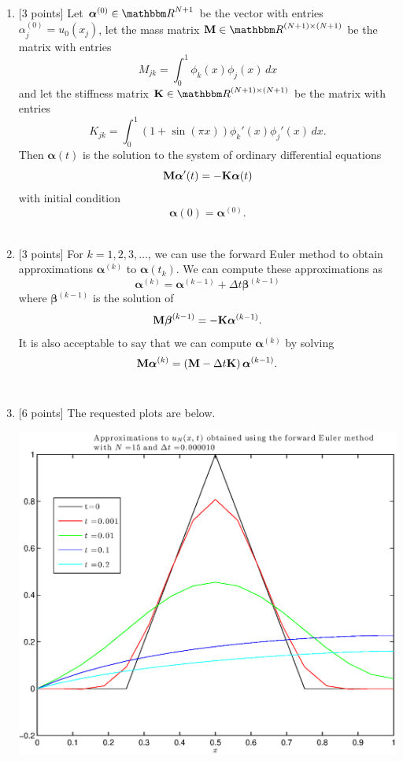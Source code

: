 \begin{solution}
\begin{enumerate}
\item {[3 points]} Let $\boldsymbol{\alpha}^{(0)}\in\R^{N+1}$ be the vector with entries $\alpha_j^{(0)}=u_0(x_j)$, let the mass matrix $\BM\in\R^{\left(N+1\right)\times\left(N+1\right)}$ be the matrix with entries
\[
M_{jk}=\int_0^1\phi_k(x)\phi_j(x)\,dx
\]
and let the stiffness matrix $\BK\in\R^{\left(N+1\right)\times\left(N+1\right)}$ be the matrix with entries
\[
K_{jk}=\int_0^1(1+\sin(\pi x))\phi_k'(x)\phi_j'(x)\,dx.
\]
Then $\boldsymbol{\alpha}(t)$ is the solution to the system of ordinary differential equations
\[
{\bf M}\boldsymbol{\alpha}'(t)=-{\bf K}\boldsymbol{\alpha}(t)
\]
with initial condition
\[
\boldsymbol{\alpha}(0)=\boldsymbol{\alpha}^{(0)}.
\]
\\
\item {[3 points]} For $k=1,2,3,\ldots$, we can use the forward Euler method to obtain approximations $\boldsymbol{\alpha}^{(k)}$ to $\boldsymbol{\alpha}(t_k)$. We can compute these approximations as
\[
\boldsymbol{\alpha}^{(k)}=\boldsymbol{\alpha}^{(k-1)}+\Delta t\boldsymbol{\beta}^{(k-1)}
\]
where $\boldsymbol{\beta}^{(k-1)}$ is the solution of
\[
{\bf M}\boldsymbol{\beta}^{(k-1)}=-{\bf K}\boldsymbol{\alpha}^{(k-1)}.
\]
It is also acceptable to say that we can compute $\boldsymbol{\alpha}^{(k)}$ by solving
\[
{\bf M}\boldsymbol{\alpha}^{(k)}=\left({\bf M}-\Delta t{\bf K}\right)\boldsymbol{\alpha}^{(k-1)}.
\]
\\
\item {[6 points]} The requested plots are below.

\begin{center}
\includegraphics[scale=0.75]{hw50c15.eps}
\end{center}


\end{enumerate}
\end{solution}
